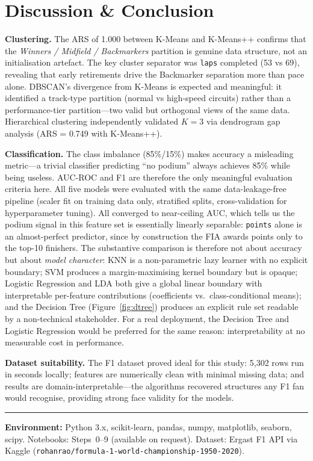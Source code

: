 \documentclass[11pt,a4paper]{article}
\begin{document}
\section{Discussion \& Conclusion}

\textbf{Clustering.}
The ARS of 1.000 between K-Means and K-Means++ confirms that the
\textit{Winners / Midfield / Backmarkers} partition is genuine data structure,
not an initialisation artefact. The key cluster separator was \texttt{laps}
completed (53 vs 69), revealing that early retirements drive the Backmarker
separation more than pace alone. DBSCAN's divergence from K-Means is expected
and meaningful: it identified a track-type partition (normal vs high-speed
circuits) rather than a performance-tier partition---two valid but orthogonal
views of the same data. Hierarchical clustering independently validated $K=3$
via dendrogram gap analysis (ARS = 0.749 with K-Means++).

\textbf{Classification.}
The class imbalance (85\%/15\%) makes accuracy a misleading metric---a trivial
classifier predicting ``no podium'' always achieves 85\% while being useless.
AUC-ROC and F1 are therefore the only meaningful evaluation criteria here.
All five models were evaluated with the same data-leakage-free pipeline (scaler
fit on training data only, stratified splits, cross-validation for hyperparameter
tuning). All converged to near-ceiling AUC, which tells us the podium signal
in this feature set is essentially linearly separable: \texttt{points} alone
is an almost-perfect predictor, since by construction the FIA awards points
only to the top-10 finishers. The substantive comparison is therefore not about
accuracy but about \emph{model character}: KNN is a non-parametric lazy learner
with no explicit boundary; SVM produces a margin-maximising kernel boundary
but is opaque; Logistic Regression and LDA both give a global linear boundary
with interpretable per-feature contributions (coefficients vs.\ class-conditional
means); and the Decision Tree (Figure~\ref{fig:dtree}) produces an explicit
rule set readable by a non-technical stakeholder. For a real deployment, the
Decision Tree and Logistic Regression would be preferred for the same reason:
interpretability at no measurable cost in performance.

\textbf{Dataset suitability.}
The F1 dataset proved ideal for this study: 5,302 rows run in seconds locally;
features are numerically clean with minimal missing data; and results are
domain-interpretable---the algorithms recovered structures any F1 fan would
recognise, providing strong face validity for the models.

\vspace{6pt}
\noindent\rule{\linewidth}{0.4pt}
\vspace{2pt}
\noindent\small\textbf{Environment:} Python 3.x, scikit-learn, pandas, numpy,
matplotlib, seaborn, scipy. Notebooks: Steps~0--9 (available on request).
Dataset: Ergast F1 API via Kaggle (\texttt{rohanrao/formula-1-world-championship-1950-2020}).
\end{document}
